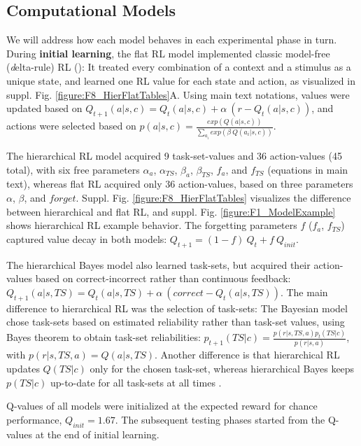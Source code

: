 \documentclass[10pt,letterpaper]{article}  %
\begin{document}
\subsection*{Computational Models}
We will address how each model behaves in each experimental phase in turn.
During \textbf{initial learning}, the flat RL model implemented classic model-free ({\textit delta-rule}) RL (\cite{sutton_reinforcement_2017}): It treated every combination of a context and a stimulus as a unique state, and learned one RL value for each state and action, as visualized in suppl. Fig. \ref{figure:F8_HierFlatTables}A.
Using main text notations, values were updated based on $Q_{t+1}(a|s,c) = Q_t(a|s,c) + \alpha\ (r - Q_t(a|s,c))$, and actions were selected based on $p(a|s,c) = \frac{exp(Q(a|s,c))}{\sum_{a_i} exp(\beta\ Q(a_i|s,c))}$. 

The hierarchical RL model acquired 9 task-set-values and 36 action-values (45 total), with six free parameters $\alpha_{a}$, $\alpha_{TS}$, $\beta_{a}$, $\beta_{TS}$, $f_{a}$, and $f_{TS}$ (equations in main text), whereas flat RL acquired only 36 action-values, based on three parameters $\alpha$, $\beta$, and $forget$. Suppl. Fig. \ref{figure:F8_HierFlatTables} visualizes the difference between hierarchical and flat RL, and suppl. Fig. \ref{figure:F1_ModelExample} shows hierarchical RL example behavior.
The forgetting parameters $f$ ($f_a$, $f_{TS}$) captured value decay in both models: $Q_{t+1} = (1 - f)\ Q_{t} + f\ Q_{init}$.

The hierarchical Bayes model also learned task-sets, but acquired their action-values based on correct-incorrect rather than continuous feedback: $Q_{t+1}(a|s,TS) = Q_t(a|s,TS) + \alpha\ (correct - Q_t(a|s,TS))$. The main difference to hierarchical RL was the selection of task-sets: The Bayesian model chose task-sets based on estimated reliability rather than task-set values, using Bayes theorem to obtain task-set reliabilities: $p_{t+1}(TS|c) = \frac{p(r|s,TS,a) p_t(TS|c)}{p(r|s,a)}$, with $p(r|s,TS,a) = Q(a|s,TS)$.
Another difference is that hierarchical RL updates $Q(TS|c)$ only for the chosen task-set, whereas hierarchical Bayes keeps $p(TS|c)$ up-to-date for all task-sets at all times \cite{collins_reasoning_2012,donoso_foundations_2014}.

Q-values of all models were initialized at the expected reward for chance performance, $Q_{init}=1.67$.
The subsequent testing phases started from the Q-values at the end of initial learning.
\end{document}
